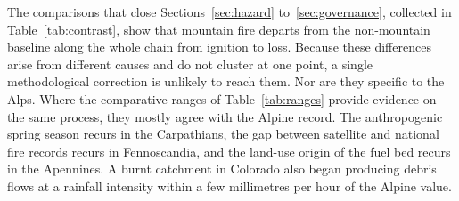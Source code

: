 \documentclass[11pt,a4paper]{article}
\begin{document}
The comparisons that close Sections~\ref{sec:hazard} to~\ref{sec:governance}, collected in Table~\ref{tab:contrast}, show that mountain fire departs from the non-mountain baseline along the whole chain from ignition to loss. Because these differences arise from different causes and do not cluster at one point, a single methodological correction is unlikely to reach them. Nor are they specific to the Alps. Where the comparative ranges of Table~\ref{tab:ranges} provide evidence on the same process, they mostly agree with the Alpine record. The anthropogenic spring season recurs in the Carpathians, the gap between satellite and national fire records recurs in Fennoscandia, and the land-use origin of the fuel bed recurs in the Apennines. A burnt catchment in Colorado also began producing debris flows at a rainfall intensity within a few millimetres per hour of the Alpine value.
\end{document}
